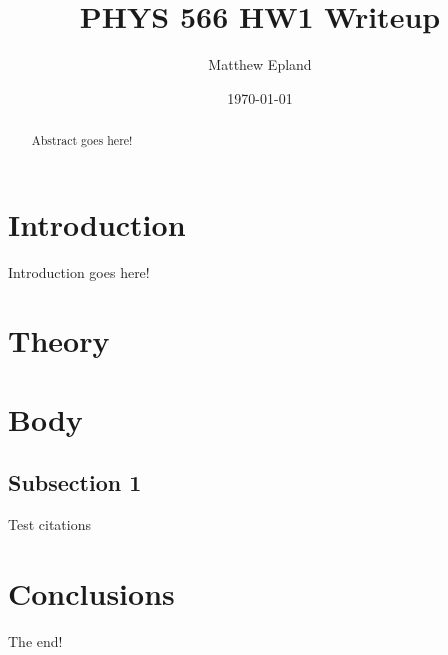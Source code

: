 \documentclass[aps,prd,twocolumn,nofootinbib]{revtex4-1}
\begin{document}
\title{PHYS 566 HW1 Writeup}
\author{Matthew Epland}


\date{\today}

\begin{abstract}
Abstract goes here!
\end{abstract}\maketitle

\section{Introduction}
\label{sec:intro}
Introduction goes here!

\section{Theory}
\label{sec:theory}

\section{Body}
\label{sec:body}


\subsection{Subsection 1}
Test citations~\cite{Winklmeier} ~\cite{ref_1} ~\cite{ref_2}

\section{Conclusions}
The end!




\end{document}
